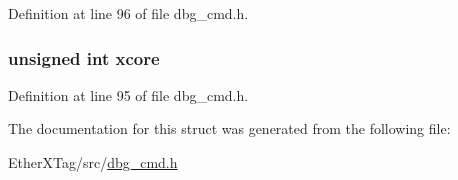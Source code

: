 Definition at line 96 of file dbg\-\_\-cmd.\-h.

\hypertarget{structdbg__cmd__type__get__core__state_a78357326dd562d441c3c73f5676ac638}{
\subsubsection[{xcore}]{\setlength{\rightskip}{0pt plus 5cm}unsigned int xcore}}\label{structdbg__cmd__type__get__core__state_a78357326dd562d441c3c73f5676ac638}


Definition at line 95 of file dbg\-\_\-cmd.\-h.



The documentation for this struct was generated from the following file\-:\begin{DoxyCompactItemize}
\item 
Ether\-X\-Tag/src/\hyperlink{dbg__cmd_8h}{dbg\-\_\-cmd.\-h}\end{DoxyCompactItemize}
